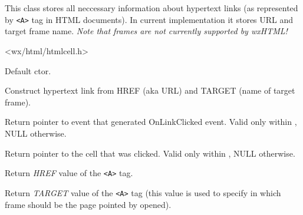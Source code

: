 \section{}\label{wxhtmllinkinfo}

This class stores all neccessary information about hypertext
links (as represented by {\tt <A>} tag in HTML documents). In 
current implementation it stores URL and target frame name.
{\it Note that frames are not currently supported by wxHTML!}




<wx/html/htmlcell.h>


\label{wxhtmllinkinfowxhtmllinkinfo}


Default ctor.


Construct hypertext link from HREF (aka URL) and TARGET (name of target
frame).

\label{wxhtmllinkinfogetevent}


Return pointer to event that generated OnLinkClicked event. Valid
only within ,
NULL otherwise.

\label{wxhtmllinkinfogethtmlcell}


Return pointer to the cell that was clicked. Valid
only within ,
NULL otherwise.


\label{wxhtmllinkinfogethref}


Return {\it HREF} value of the {\tt <A>} tag.

\label{wxhtmllinkinfogettarget}


Return {\it TARGET} value of the {\tt <A>} tag (this value
is used to specify in which frame should be the page pointed
by  opened).

